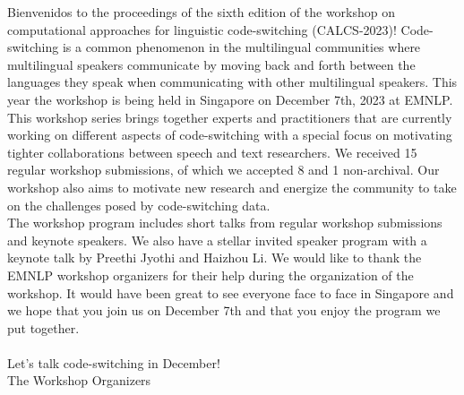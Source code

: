 Bienvenidos to the proceedings of the sixth edition of the workshop on computational approaches for linguistic code-switching (CALCS-2023)! 
Code-switching is a common phenomenon in the multilingual communities where multilingual speakers communicate by moving back and forth between the languages they speak when communicating with other multilingual speakers. 
This year the workshop is being held in Singapore on December 7th, 2023 at EMNLP. \\

This workshop series brings together experts and practitioners that are currently working on different aspects of code-switching with a special focus on motivating tighter collaborations between speech and text researchers. 
We received 15 regular workshop submissions, of which we accepted 8 and 1 non-archival. 
Our workshop also aims to motivate new research and energize the community to take on the challenges posed by code-switching data. \\
%

The workshop program includes short talks from regular workshop submissions and keynote speakers. 
We also have a stellar invited speaker program with a keynote talk by Preethi Jyothi and Haizhou Li. 
We would like to thank the EMNLP workshop organizers for their help during the organization of the workshop. 
It would have been great to see everyone face to face in Singapore and we hope that you join us on December 7th and that you enjoy the program we put together. \\ \\

%
Let’s talk code-switching in December! \\

%
The Workshop Organizers
